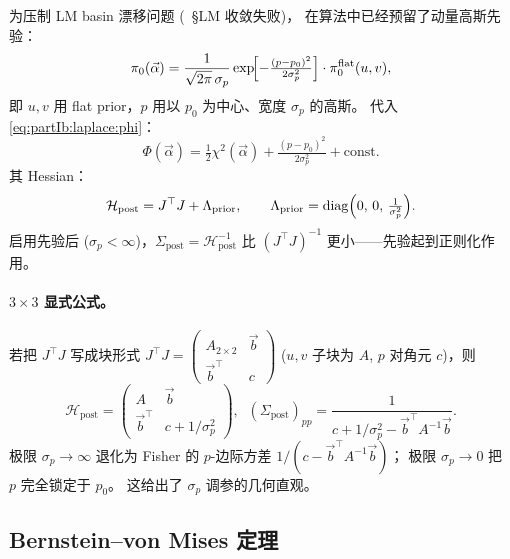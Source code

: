 为压制 LM basin 漂移问题 (\StatusReport\ §LM 收敛失败)，
在算法中已经预留了动量高斯先验：
\begin{equation}
  \pi_0(\vec\alpha)
  =\frac{1}{\sqrt{2\pi}\,\sigma_{p}}
   \exp\!\Bigl[-\tfrac{(p-p_0)^2}{2\sigma_p^2}\Bigr]
   \cdot\pi_0^{\mathrm{flat}}(u,v),
  \label{eq:partIb:laplace:gauss_prior}
\end{equation}
即 $u,v$ 用 flat prior，$p$ 用以 $p_0$ 为中心、宽度 $\sigma_p$ 的高斯。
代入 \eqref{eq:partIb:laplace:phi}：
\begin{equation}
  \Phi(\vec\alpha)
  = \tfrac12\chi^2(\vec\alpha)
   +\tfrac{(p-p_0)^2}{2\sigma_p^2}+\mathrm{const}.
  \label{eq:partIb:laplace:phi_prior}
\end{equation}
其 Hessian：
\begin{equation}
  \mathcal H_{\mathrm{post}}
  = J^{\top}J + \Lambda_{\mathrm{prior}},
  \qquad
  \Lambda_{\mathrm{prior}}
  = \mathrm{diag}\Bigl(0,\,0,\,\tfrac{1}{\sigma_p^2}\Bigr).
  \label{eq:partIb:laplace:H_with_prior}
\end{equation}
启用先验后 ($\sigma_p<\infty$)，$\Sigma_{\mathrm{post}}=\mathcal H_{\mathrm{post}}^{-1}$
比 $(J^{\top}J)^{-1}$ 更小——先验起到正则化作用。

\paragraph{$3{\times}3$ 显式公式。}
若把 $J^{\top}J$ 写成块形式
$J^{\top}J=\begin{pmatrix} A_{2\times 2} & \vec b\\ \vec b^{\top} & c\end{pmatrix}$
($u,v$ 子块为 $A$, $p$ 对角元 $c$)，则
\begin{equation}
  \mathcal H_{\mathrm{post}}
  =\begin{pmatrix} A & \vec b\\ \vec b^{\top} & c+1/\sigma_p^2\end{pmatrix},
  \;\;
  (\Sigma_{\mathrm{post}})_{pp}
  = \frac{1}{c+1/\sigma_p^2-\vec b^{\top}A^{-1}\vec b}.
  \label{eq:partIb:laplace:p_var}
\end{equation}
极限 $\sigma_p\to\infty$ 退化为 Fisher 的 $p$-边际方差
$1/(c-\vec b^{\top}A^{-1}\vec b)$；
极限 $\sigma_p\to 0$ 把 $p$ 完全锁定于 $p_0$。
这给出了 $\sigma_p$ 调参的几何直观。

\subsection{Bernstein--von Mises 定理}
\label{sec:partIb:laplace:bvm}

